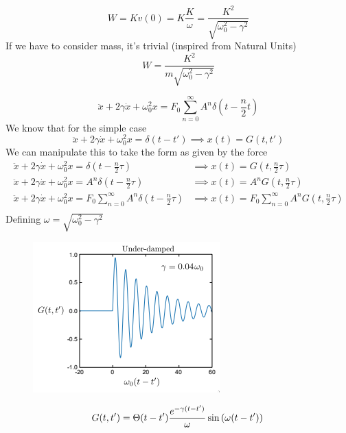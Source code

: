 \documentclass[letterpaper]{article}
\begin{document}
\[
W = K v(0) = K \frac{K}{\omega} = \frac{K^2}{\sqrt{\omega_0^2 - \gamma^2} }
\] 
If we have to consider mass, it's trivial (inspired from Natural Units)
\[
W = \frac{K^2}{m \sqrt{\omega_0^2 - \gamma^2} }
\] 


\[
\ddot{x} + 2 \gamma \dot{x} + \omega_0^2 x = F_0 \sum_{n=0}^{\infty} A^{n} \delta \left(t - \frac{n}{2} t\right)
\] 
We know that for the simple case
\[
\ddot{x} + 2 \gamma \dot{x} + \omega_0^2 x = \delta(t -t') \implies x(t) = 
G(t,t')
\] 
We can manipulate this to take the form as given by the force
\begin{align*}
\ddot{x} + 2 \gamma \dot{x} + \omega_0^2 x = \delta\left(t - \frac{n}{2} \tau \right) 
 & \implies x(t) = G\left(t, \frac{n}{2} \tau\right)  \\ 
\ddot{x} + 2 \gamma \dot{x} + \omega_0^2 x = A^{n}\delta\left(t - \frac{n}{2} \tau \right) 
 & \implies x(t) = A^{n} G\left(t, \frac{n}{2} \tau\right)  \\
\ddot{x} + 2 \gamma \dot{x} + \omega_0^2 x =F_0 \sum_{n=0}^{\infty}  A^{n}\delta\left(t - \frac{n}{2} \tau \right) 
 & \implies x(t) = F_0 \sum_{n=0}^{\infty} A^{n} G\left(t, \frac{n}{2} \tau\right)  \\
\end{align*}
Defining  $\omega = \sqrt{\omega_0^2 - \gamma^2 } $

\begin{minipage}{0.4 \textwidth}
\begin{figure}[H]
	\centering
	\includegraphics[width=0.9 \textwidth]{ss/5/p3-1.png}
	\label{fig:ss-5-p3-1-png}
\end{figure}  
\end{minipage}\hfill %
\begin{minipage}{0.6\textwidth}
\[
G(t,t') = \Theta(t - t') 
\frac{e^{- \gamma (t-t')}}{\omega}  
\sin\left(\omega (t-t')\right)
\\ \]
\end{minipage}
\end{document}
